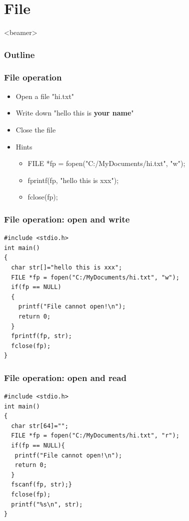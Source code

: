 \section{File}
\label{sec:file}
\begin{frame}<beamer>
    \frametitle{Outline}
    \tableofcontents[currentsection]
\end{frame}

\begin{frame}
\frametitle{File operation}
\begin{itemize}
	\item {Open a file "hi.txt"}
	\item {Write down "hello this is \textbf{your name}"}
	\item {Close the file}
	\item {Hints}
	\begin{itemize}
		\item {FILE *fp = fopen("C:/MyDocuments/hi.txt", "w");}
		\item {fprintf(fp, "hello this is xxx");}
		\item {fclose(fp);}
	\end{itemize}
\end{itemize}
\end{frame}

\ifx\answers\undefined
\begin{frame}[fragile]
\frametitle{File operation: open and write}
\begin{lstlisting}[xleftmargin=0.08\linewidth, linewidth=0.9\linewidth]
#include <stdio.h>
int main()
{
  char str[]="hello this is xxx";
  FILE *fp = fopen("C:/MyDocuments/hi.txt", "w");
  if(fp == NULL)
  {
    printf("File cannot open!\n");
    return 0;
  }
  fprintf(fp, str);
  fclose(fp);
}
\end{lstlisting}

\end{frame}
\fi

\ifx\answers\undefined
\begin{frame}[fragile]
\frametitle{File operation: open and read}
\begin{lstlisting}[xleftmargin=0.08\linewidth,linewidth=0.9\linewidth]
#include <stdio.h>
int main()
{
  char str[64]="";
  FILE *fp = fopen("C:/MyDocuments/hi.txt", "r");
  if(fp == NULL){
   printf("File cannot open!\n");
   return 0;
  }
  fscanf(fp, str);}
  fclose(fp);
  printf("%s\n", str);
}
\end{lstlisting}
\end{frame}
\fi

